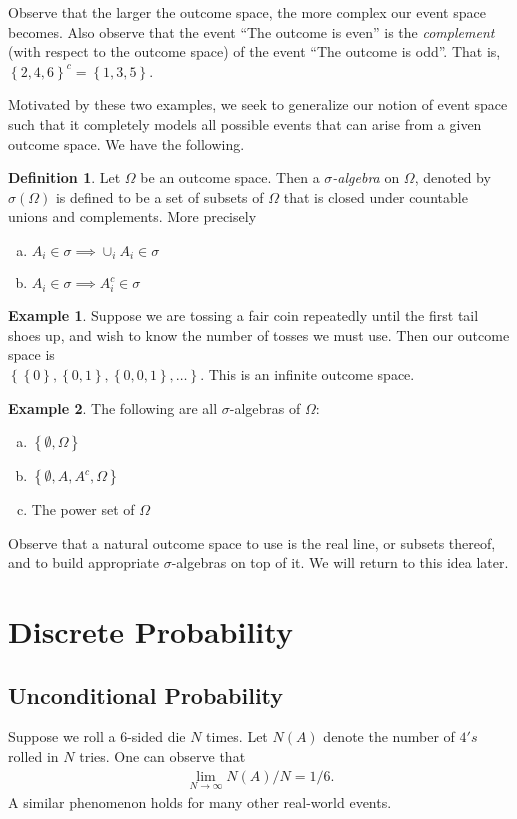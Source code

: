 \documentclass[12pt]{article}
\theoremstyle{plain}
\theoremstyle{definition}
\newtheorem*{definition}{Definition}
\newtheorem*{example}{Example}
\theoremstyle{remark}
\numberwithin{equation}{section}  %
\begin{document}
Observe that the larger the outcome space, the more complex
our event space becomes. Also observe that the event
``The outcome is even'' is the \emph{complement} (with respect to the 
outcome space) of
the event ``The outcome is odd''. That is, $ \left\{ 2,4,6 \right\}^c
= \left\{ 1,3,5 \right\} $. 

Motivated by these two examples, we seek to generalize our notion of 
event space such that it completely models all possible events
that can arise from a given outcome space. We have the following.
\begin{definition}
Let $\Omega$ be an outcome space. Then a \emph{$\sigma$-algebra}
on $\Omega$, denoted by $\sigma(\Omega)$ is defined to be a
set of subsets of $\Omega$ that is closed under countable
unions and complements.
More precisely
\begin{enumerate}[a)]
\item $ A_i \in  \sigma \implies \cup_i A_i \in \sigma$
\item $A_i \in \sigma \implies A_i^c \in \sigma$
\end{enumerate}
\end{definition}
\begin{example}
Suppose we are tossing a fair coin repeatedly until the first tail shoes up,
and wish to know the number of tosses we must use. Then our outcome space
is \\ $ \left\{ \left\{ 0 \right\} , \left\{ 0,1 \right\} , \left\{ 0,0,1
\right\},\ldots \right\}$. This is an infinite outcome space.
\end{example}
\begin{example} The following are all $\sigma$-algebras of $\Omega$:
\begin{enumerate}[a)]
\item $\left\{ \emptyset, \Omega \right\}$
\item $\left\{ \emptyset, A, A^c, \Omega \right\}$
\item The power set of $\Omega$
\end{enumerate}
\end{example}
Observe that a natural outcome space to use is the real line, or subsets
thereof, and to build appropriate $\sigma$-algebras on top of it. We will return
to this idea later.

\section{Discrete Probability}
\subsection{Unconditional Probability}
Suppose we roll a $6$-sided die $N$ times. Let $N(A)$ denote the number of $4's$
rolled in $N$ tries. One can observe that
\begin{align*}
\lim_{N \to \infty} N(A)/N = 1/6.
\end{align*}
A similar phenomenon holds for many other real-world events.
\end{document}
